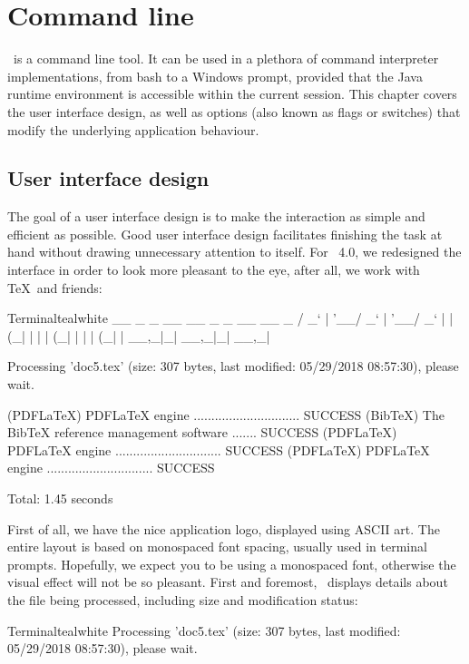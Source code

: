 \chapter{Command line}
\label{chap:commandline}

\arara\ is a command line tool. It can be used in a plethora of command interpreter implementations, from bash to a Windows prompt, provided that the Java runtime environment is accessible within the current session. This chapter covers the user interface design, as well as options (also known as flags or switches) that modify the underlying application behaviour.

\section{User interface design}
\label{sec:userinterfacedesign}

The goal of a user interface design is to make the interaction as simple and efficient as possible. Good user interface design facilitates finishing the task at hand without drawing unnecessary attention to itself. For \arara\ 4.0, we redesigned the interface in order to look more pleasant to the eye, after all, we work with \TeX\ and friends:

\begin{codebox}{Terminal}{teal}{\icnote}{white}
  __ _ _ __ __ _ _ __ __ _ 
 / _` | '__/ _` | '__/ _` |
| (_| | | | (_| | | | (_| |
 \__,_|_|  \__,_|_|  \__,_|

Processing 'doc5.tex' (size: 307 bytes, last modified: 05/29/2018
08:57:30), please wait.

(PDFLaTeX) PDFLaTeX engine .............................. SUCCESS
(BibTeX) The BibTeX reference management software ....... SUCCESS
(PDFLaTeX) PDFLaTeX engine .............................. SUCCESS
(PDFLaTeX) PDFLaTeX engine .............................. SUCCESS

Total: 1.45 seconds
\end{codebox}

First of all, we have the nice application logo, displayed using ASCII art. The entire layout is based on monospaced font spacing, usually used in terminal prompts. Hopefully, we expect you to be using a monospaced font, otherwise the visual effect will not be so pleasant. First and foremost, \arara\ displays details about the file being processed, including size and modification status:

\begin{codebox}{Terminal}{teal}{\icnote}{white}
Processing 'doc5.tex' (size: 307 bytes, last modified: 05/29/2018
08:57:30), please wait.
\end{codebox}

